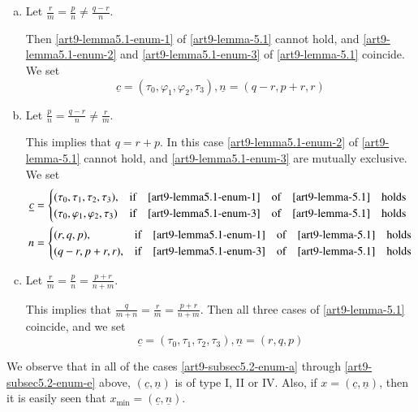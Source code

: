 \begin{enumerate}[(a)]
\item Let $\frac{r}{m} = \frac{p}{n} \neq \frac{q-r}{n}$.\label{art9-subsec5.2-enum-c}

Then \eqref{art9-lemma5.1-enum-1} of \ref{art9-lemma-5.1} cannot hold, and \eqref{art9-lemma5.1-enum-2}
and \eqref{art9-lemma5.1-enum-3} of \ref{art9-lemma-5.1} coincide. We set
$$
\underline{c} = (\tau_{0}, \varphi_{1}, \varphi_{2}, \tau_{3}), \underline{n} = (q-r, p+r, r)
$$

\item Let $\frac{p}{n} = \frac{q-r}{n} \neq \frac{r}{m}$.\label{art9-subsec5.2-enum-d}

This implies that $q=r +p$. In this case \eqref{art9-lemma5.1-enum-2} of \ref{art9-lemma-5.1} cannot hold,
and \eqref{art9-lemma5.1-enum-3} are mutually exclusive. We set
\begin{align*}
\underline{c} &=
\begin{cases}
(\tau_{0}, \tau_{1}, \tau_{2}, \tau_{3}), & \text{if}\quad \eqref{art9-lemma5.1-enum-1}\quad \text{of}\quad \ref{art9-lemma-5.1}\quad \text{holds}\\
(\tau_{0}, \varphi_{1}, \varphi_{2}, \tau_{3}) & \text{if}\quad \eqref{art9-lemma5.1-enum-3}\quad \text{of}\quad \ref{art9-lemma-5.1}\quad \text{holds}
\end{cases}\\
n&=
\begin{cases}
(r,q,p), & \text{if} \quad \eqref{art9-lemma5.1-enum-1}\quad \text{of}\quad \ref{art9-lemma-5.1}\quad \text{holds}\\
(q-r,p+r, r), & \text{if} \quad \eqref{art9-lemma5.1-enum-3}\quad \text{of}\quad \ref{art9-lemma-5.1}\quad \text{holds}
\end{cases}
\end{align*}

\item Let $\frac{r}{m}= \frac{p}{n} = \frac{p+r}{n+m}$.

This implies that $\frac{q}{m+n} =\frac{r}{m}= \frac{p+r}{n+m}$. Then all three cases of \ref{art9-lemma-5.1} coincide,
 and we set\label{art9-subsec5.2-enum-e}
$$
\underline{c} = (\tau_{0}, \tau_{1}, \tau_{2}, \tau_{3}), \underline{n} = (r,q, p)
$$
\end{enumerate}

\setcounter{equation}{2}
\begin{remark}\label{art9-remark-5.4}
We observe that in all of the cases \eqref{art9-subsec5.2-enum-a} through \eqref{art9-subsec5.2-enum-e} above, $(\underline{c}, \underline{n})$ is of type I, II or IV. Also, if $x = (\underline{c}, \underline{n})$, then it is easily seen that $x_{\min}= (\underline{c}, \underline{n})$.
\end{remark}


